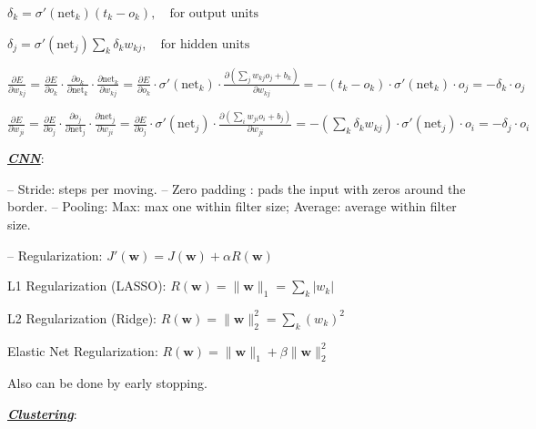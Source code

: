 \documentclass[12pt]{article}
\newcommand{\bulletPoint}[1]{\ul{\textit{\textbf{#1}}}}
\begin{document}
\begin{multicols*}{2}




$ \delta_k = \sigma'(\text{net}_k)(t_k - o_k), \quad \text{for output units} $

$ \delta_j = \sigma'(\text{net}_j) \sum_k \delta_k w_{kj}, \quad \text{for hidden units} $

\quad

$
\frac{\partial E}{\partial w_{kj}} = \frac{\partial E}{\partial o_k} \cdot \frac{\partial o_k}{\partial \text{net}_k} \cdot \frac{\partial \text{net}_k}{\partial w_{kj}}  
= \frac{\partial E}{\partial o_k} \cdot \sigma'(\text{net}_k) \cdot \frac{\partial (\sum_j w_{kj} o_j + b_k)}{\partial w_{kj}}  
= -(t_k - o_k) \cdot \sigma'(\text{net}_k) \cdot o_j 
= -\delta_k \cdot o_j
$

$ \frac{\partial E}{\partial w_{ji}} = \frac{\partial E}{\partial o_j} \cdot \frac{\partial o_j}{\partial \text{net}_j} \cdot \frac{\partial \text{net}_j}{\partial w_{ji}} 
= \frac{\partial E}{\partial o_j} \cdot \sigma'(\text{net}_j) \cdot \frac{\partial \left(\sum_i w_{ji} o_i + b_j\right)}{\partial w_{ji}} 
= -\left(\sum_k \delta_k w_{kj}\right) \cdot \sigma'(\text{net}_j) \cdot o_i 
= -\delta_j \cdot o_i $

\bulletPoint{CNN}:

– Stride: steps per moving.  – Zero padding : pads the input with zeros around the border.   – Pooling: Max: max one within filter size; Average: average within filter size. 

– Regularization: $ J'(\mathbf{w}) = J(\mathbf{w}) + \alpha R(\mathbf{w}) $

L1 Regularization (LASSO): $ R(\mathbf{w}) = \|\mathbf{w}\|_1 = \sum_k |w_k| $

L2 Regularization (Ridge): $ R(\mathbf{w}) = \|\mathbf{w}\|_2^2 = \sum_k (w_k)^2 $

Elastic Net Regularization: $ R(\mathbf{w}) = \|\mathbf{w}\|_1 + \beta \|\mathbf{w}\|_2^2 $

Also can be done by early stopping. 

\bulletPoint{Clustering}:


\end{multicols*}
\end{document}
